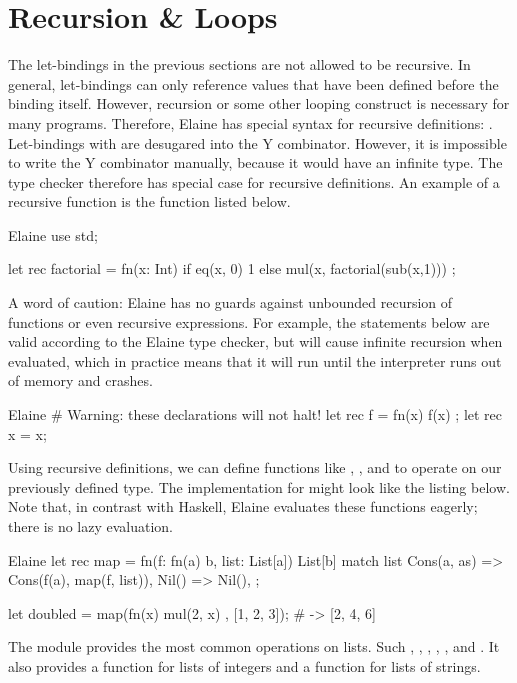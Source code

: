 \section{Recursion \& Loops}\label{sec:recursion}

The let-bindings in the previous sections are not allowed to be recursive. In general, let-bindings can only reference values that have been defined before the binding itself. However, recursion or some other looping construct is necessary for many programs. Therefore, Elaine has special syntax for recursive definitions: . Let-bindings with  are desugared into the Y combinator. However, it is impossible to write the Y combinator manually, because it would have an infinite type. The type checker therefore has special case for recursive definitions. An example of a recursive function is the  function listed below.

\begin{lst}{Elaine}
use std;

let rec factorial = fn(x: Int) {
    if eq(x, 0) {
        1
    } else {
        mul(x, factorial(sub(x,1)))
    }
};
\end{lst}
%
A word of caution: Elaine has no guards against unbounded recursion of functions or even recursive expressions. For example, the statements below are valid according to the Elaine type checker, but will cause infinite recursion when evaluated, which in practice means that it will run until the interpreter runs out of memory and crashes.

\begin{lst}{Elaine}
# Warning: these declarations will not halt!
let rec f = fn(x) { f(x) };
let rec x = x;
\end{lst}
%
Using recursive definitions, we can define functions like , , and  to operate on our previously defined  type. The implementation for  might look like the listing below. Note that, in contrast with Haskell, Elaine evaluates these functions eagerly; there is no lazy evaluation.

\begin{lst}{Elaine}
let rec map = fn(f: fn(a) b, list: List[a]) List[b] {
    match list {
        Cons(a, as) => Cons(f(a), map(f, list)),
        Nil() => Nil(),
    }
};

let doubled = map(fn(x) { mul(2, x) }, [1, 2, 3]); # -> [2, 4, 6]
\end{lst}
%
The  module provides the most common operations on lists. Such , , , , , and . It also provides a  function for lists of integers and a  function for lists of strings.

